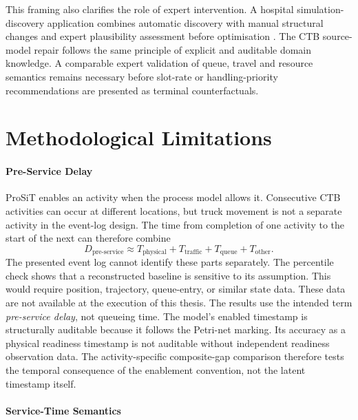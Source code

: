 This framing also clarifies the role of expert intervention. A hospital
simulation-discovery application combines automatic discovery with manual
structural changes and expert plausibility assessment before optimisation
\cite{Hospital2026Vinci}. The CTB source-model repair follows the same
principle of explicit and auditable domain knowledge. A comparable
expert validation of queue, travel and resource semantics remains necessary
before slot-rate or handling-priority recommendations are presented as terminal
counterfactuals.

\section{Methodological Limitations}
\label{sec:limitations}

\paragraph{Pre-Service Delay}

ProSiT enables an activity when the process model allows it. Consecutive CTB
activities can occur at different locations, but truck movement is not a
separate activity in the event-log design. The time from completion of one
activity to the start of the next can therefore combine
\begin{equation}
    D_{\mathrm{pre\text{-}service}} \approx
    T_{\mathrm{physical}} +
    T_{\mathrm{traffic}} +
    T_{\mathrm{queue}} +
    T_{\mathrm{other}}.
\end{equation}
The presented event log cannot identify these parts separately. The percentile check shows
that a reconstructed baseline is sensitive to its assumption. This would require position, trajectory, queue-entry, or
similar state data. These data are not available at the execution of this thesis. The results use
the intended term \textit{pre-service delay}, not queueing time.
The model's enabled timestamp is structurally auditable because it follows the
Petri-net marking. Its accuracy as a physical readiness timestamp is not
auditable without independent readiness observation data. The activity-specific
composite-gap comparison therefore tests the temporal consequence of the
enablement convention, not the latent timestamp itself.

\paragraph{Service-Time Semantics}

